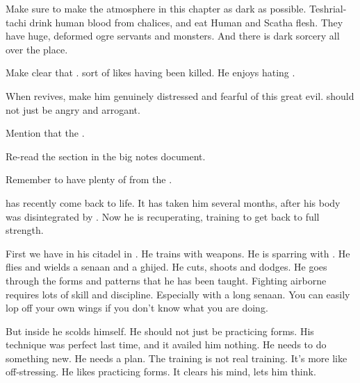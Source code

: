 





Make sure to make the atmosphere in this chapter as dark as possible. 
Teshrial-tachi drink human blood from chalices, and eat Human and Scatha flesh. 
They have huge, deformed ogre servants and monsters. 
And there is dark sorcery all over the place. 

Make clear that .
\Teshrial sort of likes having been killed. 
He enjoys hating \Ishnaruchaefir. 

When \Teshrial revives, make him genuinely distressed and fearful of this great evil.
\Teshrial should not just be angry and arrogant.
    
Mention that the \resphain {}. 

Re-read the  section in the big notes document.







\begin{comment}
\subsection{Training}
\end{comment}

Remember to have plenty of  from the \resphain. 

\Teshrial{} has recently come back to life. 
It has taken him several months, after his body was disintegrated by \Rystessakhin. 
Now he is recuperating, training to get back to full strength. 

First we have \Teshrial{} in his citadel in \Nyx. 
He trains with weapons. 
He is sparring with \Menessiaraid. 
He flies and wields a senaan and a ghijed. 
He cuts, shoots and dodges. 
He goes through the forms and patterns that he has been taught. 
Fighting airborne requires lots of skill and discipline. 
Especially with a long senaan. 
You can easily lop off your own wings if you don't know what you are doing. 

But inside he scolds himself. 
He should not just be practicing forms. 
His technique was perfect last time, and it availed him nothing. 
He needs to do something new. 
He needs a plan. 
The training is not real training. 
It's more like off-stressing. 
He likes practicing forms. 
It clears his mind, lets him think. 

